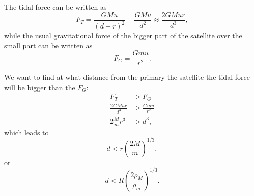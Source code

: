 \documentclass{_mypackages/monograph}
\begin{document}
The tidal force can be written as
\begin{equation}
    F_T = \frac{GMu}{(d-r)^2} - \frac{GMu}{d^2} \approx \frac{2GMu r}{d^3},
\end{equation}
while the usual gravitational force of the bigger part of the satellite over the small part can be written as
\begin{equation}
    F_G = \frac{Gmu}{r^2}.
\end{equation}

We want to find at what distance from the primary the satellite the tidal force will be bigger than the \(F_G\):
\begin{equation}
\begin{split}
    F_T &> F_G \\
    \frac{2GMu r}{d^3} &> \frac{Gmu}{r^2} \\
    2\frac{M}{m} r^3 &> d^3,
\end{split}
\end{equation}
which leads to
\begin{equation}
    d < r \left(\frac{2M}{m}\right)^{1/3},
\end{equation}
or
\begin{equation}
    d < R\left(\frac{2\rho_M}{\rho_m}\right)^{1/3}.
\end{equation}



\backmatter
\printbib
\end{document}
